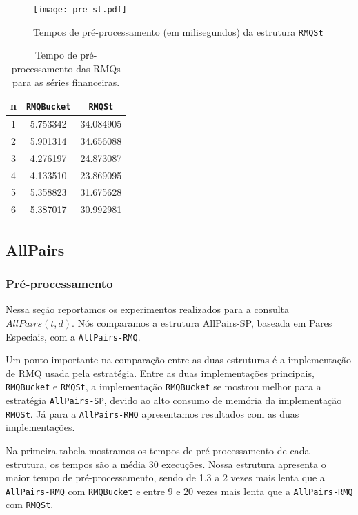 \documentclass[12pt]{article}
\begin{document}
\begin{figure}[htp]
\begin{center}
\texttt{[image: pre\_st.pdf]}
\caption{Tempos de pré-processamento (em milisegundos) da estrutura {\tt RMQSt} }
\label{fig:pre_st}
\end{center}
\end{figure}

\begin{table}
\small
\begin{center}
\begin{tabular}{|c|c|c|}
\hline
\textbf{n} & \textbf{ {\tt RMQBucket} } & \textbf{ {\tt RMQSt}}\\
\hline
1 & 5.753342 & 34.084905\\
\hline
2 & 5.901314 & 34.656088\\
\hline
3 & 4.276197 & 24.873087\\
\hline 
4 & 4.133510 & 23.869095\\
\hline
5 & 5.358823 & 31.675628\\
\hline
6 & 5.387017 & 30.992981\\
\hline
\end{tabular}
\end{center}
\label{tab:pre_series}
\caption{Tempo de pré-processamento das RMQs para as séries financeiras.}
\normalsize
\end{table}


\subsection{AllPairs}

\subsubsection{Pré-processamento}
Nessa seção reportamos os experimentos realizados para a consulta $AllPairs(t,d)$.
Nós comparamos a estrutura AllPairs-SP, baseada em Pares Especiais, com a  {\tt AllPairs-RMQ}.

Um ponto importante na comparação entre as duas estruturas é a implementação de RMQ usada pela estratégia. 
Entre as duas implementações principais, {\tt RMQBucket} e {\tt RMQSt}, a implementação {\tt RMQBucket} se mostrou melhor para 
a estratégia {\tt AllPairs-SP}, devido ao alto consumo de memória da implementação {\tt RMQSt}.
Já para a {\tt AllPairs-RMQ} apresentamos resultados com as duas implementações.

Na primeira tabela mostramos os tempos de pré-processamento de cada estrutura, os tempos são a média 30 execuções.
Nossa estrutura apresenta o maior tempo de pré-processamento,  sendo de 1.3 a 2 vezes mais lenta que a {\tt AllPairs-RMQ}
 com {\tt RMQBucket} e entre $9$ e $20$ vezes mais lenta que a {\tt AllPairs-RMQ}  com {\tt RMQSt}.
\end{document}
